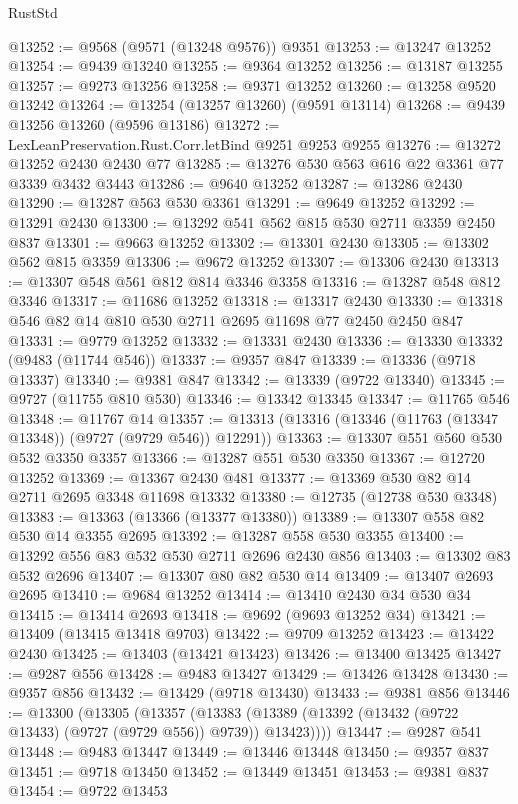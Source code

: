 \begin{lexlean}{RustStd}
\begin{coremodule}
@13252 := @9568 (@9571 (@13248 @9576)) @9351
@13253 := @13247 @13252
@13254 := @9439 @13240
@13255 := @9364 @13252
@13256 := @13187 @13255
@13257 := @9273 @13256
@13258 := @9371 @13252
@13260 := @13258 @9520 @13242
@13264 := @13254 (@13257 @13260) (@9591 @13114)
@13268 := @9439 @13256 @13260 (@9596 @13186)
@13272 := LexLeanPreservation.Rust.Corr.letBind @9251 @9253 @9255
@13276 := @13272 @13252 @2430 @2430 @77
@13285 := @13276 @530 @563 @616 @22 @3361 @77 @3339 @3432 @3443
@13286 := @9640 @13252
@13287 := @13286 @2430
@13290 := @13287 @563 @530 @3361
@13291 := @9649 @13252
@13292 := @13291 @2430
@13300 := @13292 @541 @562 @815 @530 @2711 @3359 @2450 @837
@13301 := @9663 @13252
@13302 := @13301 @2430
@13305 := @13302 @562 @815 @3359
@13306 := @9672 @13252
@13307 := @13306 @2430
@13313 := @13307 @548 @561 @812 @814 @3346 @3358
@13316 := @13287 @548 @812 @3346
@13317 := @11686 @13252
@13318 := @13317 @2430
@13330 := @13318 @546 @82 @14 @810 @530 @2711 @2695 @11698 @77 @2450 @2450 @847
@13331 := @9779 @13252
@13332 := @13331 @2430
@13336 := @13330 @13332 (@9483 (@11744 @546))
@13337 := @9357 @847
@13339 := @13336 (@9718 @13337)
@13340 := @9381 @847
@13342 := @13339 (@9722 @13340)
@13345 := @9727 (@11755 @810 @530)
@13346 := @13342 @13345
@13347 := @11765 @546
@13348 := @11767 @14
@13357 := @13313 (@13316 (@13346 (@11763 (@13347 @13348)) (@9727 (@9729 @546)) @12291))
@13363 := @13307 @551 @560 @530 @532 @3350 @3357
@13366 := @13287 @551 @530 @3350
@13367 := @12720 @13252
@13369 := @13367 @2430 @481
@13377 := @13369 @530 @82 @14 @2711 @2695 @3348 @11698 @13332
@13380 := @12735 (@12738 @530 @3348)
@13383 := @13363 (@13366 (@13377 @13380))
@13389 := @13307 @558 @82 @530 @14 @3355 @2695
@13392 := @13287 @558 @530 @3355
@13400 := @13292 @556 @83 @532 @530 @2711 @2696 @2430 @856
@13403 := @13302 @83 @532 @2696
@13407 := @13307 @80 @82 @530 @14
@13409 := @13407 @2693 @2695
@13410 := @9684 @13252
@13414 := @13410 @2430 @34 @530 @34
@13415 := @13414 @2693
@13418 := @9692 (@9693 @13252 @34)
@13421 := @13409 (@13415 @13418 @9703)
@13422 := @9709 @13252
@13423 := @13422 @2430
@13425 := @13403 (@13421 @13423)
@13426 := @13400 @13425
@13427 := @9287 @556
@13428 := @9483 @13427
@13429 := @13426 @13428
@13430 := @9357 @856
@13432 := @13429 (@9718 @13430)
@13433 := @9381 @856
@13446 := @13300
    (@13305
      (@13357 (@13383 (@13389 (@13392 (@13432 (@9722 @13433) (@9727 (@9729 @556)) @9739)) @13423))))
@13447 := @9287 @541
@13448 := @9483 @13447
@13449 := @13446 @13448
@13450 := @9357 @837
@13451 := @9718 @13450
@13452 := @13449 @13451
@13453 := @9381 @837
@13454 := @9722 @13453

\end{coremodule}
\end{lexlean}
